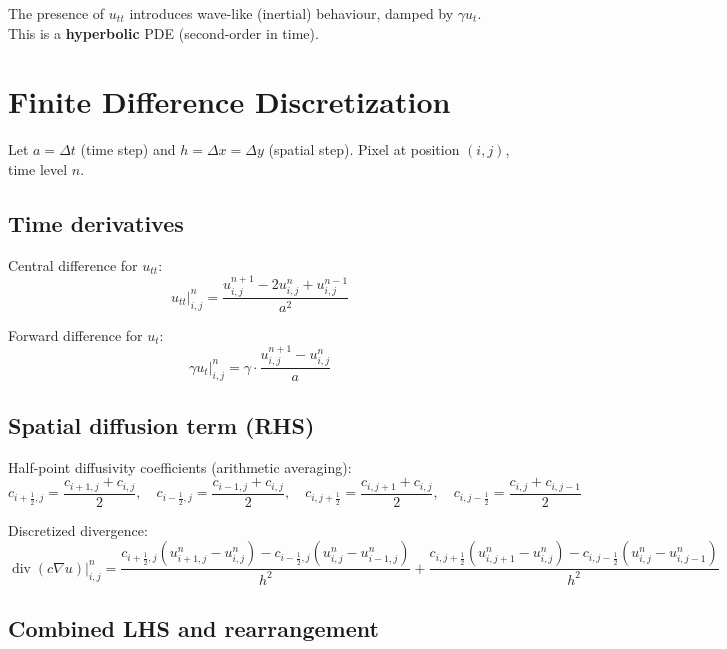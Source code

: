 \documentclass{report}
\begin{document}
The presence of $u_{tt}$ introduces wave-like (inertial) behaviour, damped by $\gamma u_t$.
This is a \textbf{hyperbolic} PDE (second-order in time).

\section*{Finite Difference Discretization}

Let $a = \Delta t$ (time step) and $h = \Delta x = \Delta y$ (spatial step).
Pixel at position $(i,j)$, time level $n$.

\subsection*{Time derivatives}

Central difference for $u_{tt}$:
\begin{equation}
	u_{tt}\big|_{i,j}^n = \frac{u_{i,j}^{n+1} - 2u_{i,j}^n + u_{i,j}^{n-1}}{a^2}
\end{equation}

Forward difference for $u_t$:
\begin{equation}
	\gamma u_t\big|_{i,j}^n = \gamma \cdot \frac{u_{i,j}^{n+1} - u_{i,j}^n}{a}
\end{equation}

\subsection*{Spatial diffusion term (RHS)}

Half-point diffusivity coefficients (arithmetic averaging):
\begin{equation}
	c_{i+\frac{1}{2},j} = \frac{c_{i+1,j}+c_{i,j}}{2}, \quad
	c_{i-\frac{1}{2},j} = \frac{c_{i-1,j}+c_{i,j}}{2}, \quad
	c_{i,j+\frac{1}{2}} = \frac{c_{i,j+1}+c_{i,j}}{2}, \quad
	c_{i,j-\frac{1}{2}} = \frac{c_{i,j}+c_{i,j-1}}{2}
\end{equation}

Discretized divergence:
\begin{equation}
	\operatorname{div}(c\nabla u)\big|_{i,j}^n =
	\frac{
		c_{i+\frac{1}{2},j}(u_{i+1,j}^n - u_{i,j}^n)
		- c_{i-\frac{1}{2},j}(u_{i,j}^n   - u_{i-1,j}^n)
	}{h^2}
	+
	\frac{
		c_{i,j+\frac{1}{2}}(u_{i,j+1}^n - u_{i,j}^n)
		- c_{i,j-\frac{1}{2}}(u_{i,j}^n   - u_{i,j-1}^n)
	}{h^2}
\end{equation}

\subsection*{Combined LHS and rearrangement}
\end{document}
